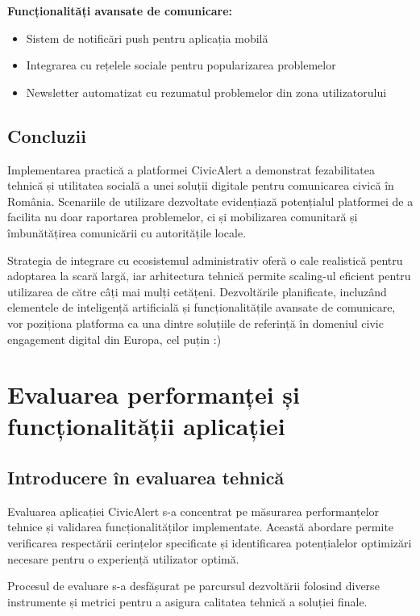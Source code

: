 \documentclass[12pt,a4paper]{report}
\begin{document}
\textbf{Funcționalități avansate de comunicare:}
\begin{itemize}
\item Sistem de notificări push pentru aplicația mobilă
\item Integrarea cu rețelele sociale pentru popularizarea problemelor
\item Newsletter automatizat cu rezumatul problemelor din zona utilizatorului
\end{itemize}

\section{Concluzii}

Implementarea practică a platformei CivicAlert a demonstrat fezabilitatea tehnică și utilitatea socială a unei soluții digitale pentru comunicarea civică în România. Scenariile de utilizare dezvoltate evidențiază potențialul platformei de a facilita nu doar raportarea problemelor, ci și mobilizarea comunitară și îmbunătățirea comunicării cu autoritățile locale.

Strategia de integrare  cu ecosistemul administrativ oferă o cale realistică pentru adoptarea la scară largă, iar arhitectura tehnică permite scaling-ul eficient pentru utilizarea de către câți mai mulți cetățeni. Dezvoltările planificate, incluzând elementele de inteligență artificială și funcționalitățile avansate de comunicare, vor poziționa platforma ca una dintre soluțiile de referință în domeniul civic engagement digital din Europa, cel puțin :) 
\newpage
\chapter{Evaluarea performanței și funcționalității aplicației}

\section{Introducere în evaluarea tehnică}

Evaluarea aplicației CivicAlert s-a concentrat pe măsurarea performanțelor tehnice și validarea funcționalităților implementate. Această abordare permite verificarea respectării cerințelor specificate și identificarea potențialelor optimizări necesare pentru o experiență utilizator optimă.

Procesul de evaluare s-a desfășurat pe parcursul dezvoltării folosind diverse instrumente și metrici pentru a asigura calitatea tehnică a soluției finale.
\end{document}

